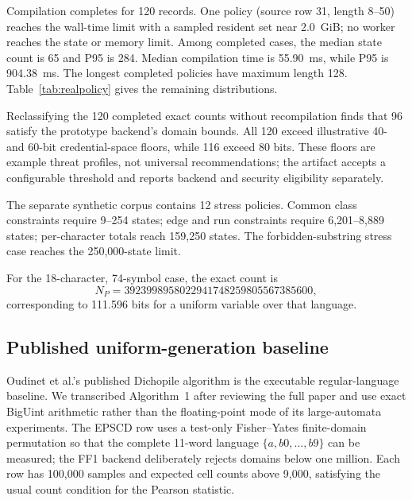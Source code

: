 \documentclass[preprint,12pt]{elsarticle}
\begin{document}
Compilation completes for 120 records. One policy (source row 31, length
8--50) reaches the wall-time limit with a sampled resident set near 2.0~GiB;
no worker reaches the state or memory limit. Among completed cases, the median
state count is 65 and P95 is 284. Median compilation time is 55.90~ms, while
P95 is 904.38~ms. The longest completed policies have maximum length 128.
Table~\ref{tab:realpolicy} gives the remaining distributions.



Reclassifying the 120 completed exact counts without recompilation finds that
96 satisfy the prototype backend's domain bounds. All 120 exceed illustrative
40- and 60-bit credential-space floors, while 116 exceed 80 bits. These floors
are example threat profiles, not universal recommendations; the artifact
accepts a configurable threshold and reports backend and security eligibility
separately.

The separate synthetic corpus contains 12 stress policies. Common class
constraints require 9--254 states; edge and run constraints require
6,201--8,889 states; per-character totals reach 159,250 states. The
forbidden-substring stress case reaches the 250,000-state limit.



For the 18-character, 74-symbol case, the exact count is
\begin{equation*}
N_P=3923998958022941748259805567385600,
\end{equation*}
corresponding to 111.596 bits for a uniform variable over that language.

\subsection{Published uniform-generation baseline}

Oudinet et al.'s published Dichopile algorithm is the executable
regular-language baseline. We transcribed Algorithm~1 after reviewing the full
paper and use exact BigUint arithmetic rather than the floating-point mode of
its large-automata experiments. The EPSCD row uses a test-only Fisher--Yates
finite-domain permutation so that the complete 11-word language
$\{a,b0,\ldots,b9\}$ can be measured; the FF1 backend deliberately rejects
domains below one million. Each row has 100,000 samples and expected cell
counts above 9,000, satisfying the usual count condition for the Pearson
statistic.


\end{document}
